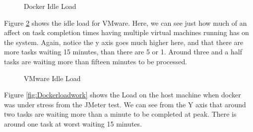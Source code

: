 \begin{figure}[H]
\caption{Docker Idle Load}
\label{fig:Dockerloadidle}
\centering
\end{figure}

Figure \ref{fig:VMwareloadidle} shows the idle load for VMware. Here, we can see just how much of an affect on task completion times having multiple virtual machines running has on the system. Again, notice the y axis goes much higher here, and that there are more tasks waiting 15 minutes, than there are 5 or 1. Around three and a half tasks are waiting more than fifteen minutes to be processed.

\begin{figure}[H]
\caption{VMware Idle Load}
\label{fig:VMwareloadidle}
\centering
\end{figure}

Figure \ref{fig:Dockerloadwork} shows the Load on the host machine when docker was under stress from the JMeter test. We can see from the Y axis that around two tasks are waiting more than a minute to be completed at peak. There is around one task at worst waiting 15 minutes.

